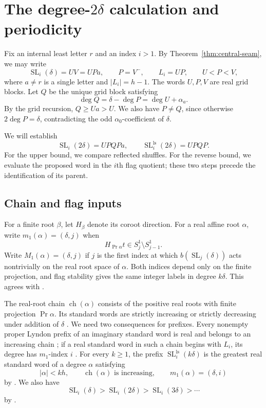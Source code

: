 \documentclass[11pt]{amsart}
\numberwithin{equation}{section}
\theoremstyle{definition}
\DeclareMathOperator{\SL}{SL}
\DeclareMathOperator{\Prj}{Pr}
\DeclareMathOperator{\ch}{ch}
\newcommand{\ls}{\mathrm{ls}}
\newcommand{\br}[1]{b(#1)}
\begin{document}
\section{The degree-\texorpdfstring{$2\delta$}{2delta} calculation and periodicity}\label{sec:degree-two}

Fix an internal least letter $r$ and an index $i>1$. By Theorem~\ref{thm:central-seam}, we may write
\begin{equation}\label{eq:two-setup}
 \SL_i(\delta)=UV=UPa,
 \qquad P=V^{-},\qquad L_i=UP,
 \qquad U<P<V,
\end{equation}
where $a\ne r$ is a single letter and $|L_i|=h-1$. The words $U,P,V$ are real grid blocks. Let $Q$ be the unique grid block satisfying
\begin{equation}\label{eq:Q-degree}
 \deg Q=\delta-\deg P=\deg U+\alpha_a.
\end{equation}
By the grid recursion, $Q\geq Ua>U$. We also have $P\ne Q$, since otherwise $2\deg P=\delta$, contradicting the odd $\alpha_0$-coefficient of $\delta$.

We will establish
\begin{equation}\label{eq:two-target}
 \SL_i(2\delta)=UPQPa,
 \qquad
 \SL_i^{\ls}(2\delta)=UPQP.
\end{equation}
For the upper bound, we compare reflected shuffles. For the reverse bound, we evaluate the proposed word in the $i$th flag quotient; these two steps precede the identification of its parent.

\subsection{Chain and flag inputs}\label{subsec:inputs}
For a finite root $\beta$, let $H_\beta$ denote its coroot direction. For a real affine root $\alpha$, write $m_1(\alpha)=(\delta,j)$ when
\[
 H_{\Prj\alpha}t\in S_j^1\setminus S_{j-1}^1.
\]
Write $M_1(\alpha)=(\delta,j)$ if $j$ is the first index at which $\br{\SL_j(\delta)}$ acts nontrivially on the real root space of $\alpha$. Both indices depend only on the finite projection, and flag stability gives the same integer labels in degree $k\delta$. This agrees with \cite[Definitions~3.2--3.3]{ETC}.

The real-root chain $\ch(\alpha)$ consists of the positive real roots with finite projection $\Prj\alpha$. Its standard words are strictly increasing or strictly decreasing under addition of $\delta$ \cite[Proposition~3.16]{ETC}. We need two consequences for prefixes. Every nonempty proper Lyndon prefix of an imaginary standard word is real and belongs to an increasing chain \cite[Corollary~4.24(3)]{ETC}; if a real standard word in such a chain begins with $L_i$, its degree has $m_1$-index $i$ \cite[Lemma~6.7]{ETC}. For every $k\geq1$, the prefix $\SL_i^{\ls}(k\delta)$ is the greatest real standard word of a degree $\alpha$ satisfying
\[
 |\alpha|<kh,\qquad \ch(\alpha)\text{ is increasing},
 \qquad m_1(\alpha)=(\delta,i)
\]
by \cite[Lemma~6.14]{ETC}. We also have
\[
 \SL_i(\delta)>\SL_i(2\delta)>\SL_i(3\delta)>\cdots
\]
by \cite[Lemma~3.21]{ETC}.
\end{document}
